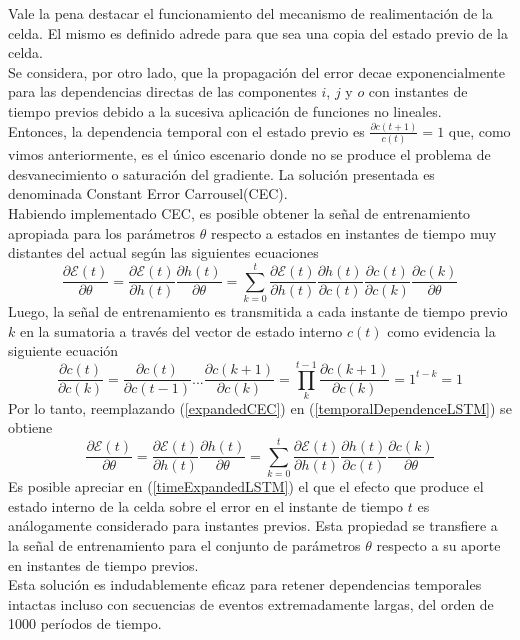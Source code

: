 \documentclass{article}
\begin{document}
	Vale la pena destacar el funcionamiento del mecanismo de realimentación de la celda. El mismo es definido adrede para que sea una copia del estado previo de la celda. \\
	Se considera, por otro lado, que la propagación del error decae exponencialmente para las dependencias directas de las componentes $i$, $j$ y $o$ con instantes de tiempo previos debido a la sucesiva aplicación de funciones no lineales\cite{25DependenciesProblemHochreiter}.\\
	Entonces, la dependencia temporal con el estado previo es $\frac{\partial c(t+1)}{c(t)} = 1$ que, como vimos anteriormente, es el único escenario donde no se produce el problema de desvanecimiento o saturación del gradiente. La solución presentada es denominada Constant Error Carrousel(CEC).\\
	Habiendo implementado CEC, es posible obtener la señal de entrenamiento apropiada para los parámetros $\theta$ respecto a estados en instantes de tiempo muy distantes del actual según las siguientes ecuaciones
	\begin{equation}\label{temporalDependenceLSTM}
	\dfrac{\partial \mathcal{E}(t)}{\partial \theta} = \dfrac{\partial \mathcal{E}(t)}{\partial h(t)} \dfrac{\partial h(t)}{\partial \theta} =\sum_{k=0}^{t} \dfrac{\partial \mathcal{E}(t)}{\partial h(t)} \dfrac{\partial h(t)}{\partial c(t)}\dfrac{\partial c(t)}{\partial c(k)}\dfrac{\partial c(k)}{\partial \theta}
	\end{equation}
	Luego, la señal de entrenamiento es transmitida a cada instante de tiempo previo $k$ en la sumatoria a través del vector de estado interno $c(t)$ como evidencia la siguiente ecuación
	\begin{equation}\label{expandedCEC}
	\dfrac{\partial c(t)}{\partial c(k)} = \dfrac{\partial c(t)}{\partial c(t-1)} ... \dfrac{\partial c(k+1)}{\partial c(k)} = \prod_{k}^{t-1} \dfrac{\partial c(k+1)}{\partial c(k)} = 1^{t-k} = 1
	\end{equation}
	Por lo tanto, reemplazando (\ref{expandedCEC}) en (\ref{temporalDependenceLSTM}) se obtiene
	\begin{equation}\label{timeExpandedLSTM}
	\dfrac{\partial \mathcal{E}(t)}{\partial \theta} = \dfrac{\partial \mathcal{E}(t)}{\partial h(t)} \dfrac{\partial h(t)}{\partial \theta}=\sum_{k=0}^{t} \dfrac{\partial \mathcal{E}(t)}{\partial h(t)} \dfrac{\partial h(t)}{\partial c(t)}\dfrac{\partial c(k)}{\partial \theta}
	\end{equation}
	Es posible apreciar en (\ref{timeExpandedLSTM}) el que el efecto que produce el estado interno de la celda sobre el error en el instante de tiempo $t$ es análogamente considerado para instantes previos. Esta propiedad se transfiere a la señal de entrenamiento para el conjunto de parámetros $\theta$ respecto a su aporte en instantes de tiempo previos.\\
	Esta solución es indudablemente eficaz para retener dependencias temporales intactas incluso con secuencias de eventos extremadamente largas, del orden de 1000 períodos de tiempo.\\
	
\end{document}
